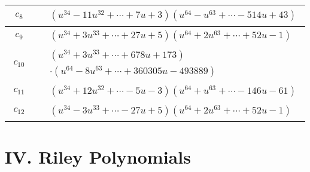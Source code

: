 \documentclass[1p]{elsarticle_modified}
\theoremstyle{definition}
\begin{document}
\begin{tabular}{m{50pt}|m{274pt}}
\hline $$\begin{aligned}c_{8}\end{aligned}$$&$\begin{aligned}
&(u^{34}-11 u^{32}+\cdots+7 u+3)(u^{64}- u^{63}+\cdots-514 u+43)
\end{aligned}$\\
\hline $$\begin{aligned}c_{9}\end{aligned}$$&$\begin{aligned}
&(u^{34}+3 u^{33}+\cdots+27 u+5)(u^{64}+2 u^{63}+\cdots+52 u-1)
\end{aligned}$\\
\hline $$\begin{aligned}c_{10}\end{aligned}$$&$\begin{aligned}
&(u^{34}+3 u^{33}+\cdots+678 u+173)\\
&\cdot(u^{64}-8 u^{63}+\cdots+360305 u-493889)
\end{aligned}$\\
\hline $$\begin{aligned}c_{11}\end{aligned}$$&$\begin{aligned}
&(u^{34}+12 u^{32}+\cdots-5 u-3)(u^{64}+u^{63}+\cdots-146 u-61)
\end{aligned}$\\
\hline $$\begin{aligned}c_{12}\end{aligned}$$&$\begin{aligned}
&(u^{34}-3 u^{33}+\cdots-27 u+5)(u^{64}+2 u^{63}+\cdots+52 u-1)
\end{aligned}$\\
\hline
\end{tabular}\newpage\renewcommand{\arraystretch}{1}
\centering \section*{ IV. Riley Polynomials}
\end{document}

